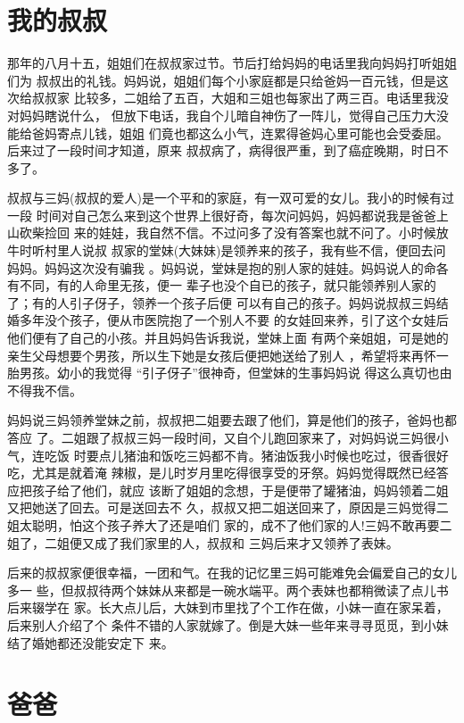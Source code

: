 \documentclass[12pt]{book}
\begin{document}
\section{我的叔叔}
\label{sec-9-24}

那年的八月十五，姐姐们在叔叔家过节。节后打给妈妈的电话里我向妈妈打听姐姐们为
叔叔出的礼钱。妈妈说，姐姐们每个小家庭都是只给爸妈一百元钱，但是这次给叔叔家
比较多，二姐给了五百，大姐和三姐也每家出了两三百。电话里我没对妈妈瞎说什么，
但放下电话，我自个儿暗自神伤了一阵儿，觉得自己压力大没能给爸妈寄点儿钱，姐姐
们竟也都这么小气，连累得爸妈心里可能也会受委屈。后来过了一段时间才知道，原来
叔叔病了，病得很严重，到了癌症晚期，时日不多了。

叔叔与三妈(叔叔的爱人)是一个平和的家庭，有一双可爱的女儿。我小的时候有过一段
时间对自己怎么来到这个世界上很好奇，每次问妈妈，妈妈都说我是爸爸上山砍柴捡回
来的娃娃，我自然不信。不过问多了没有答案也就不问了。小时候放牛时听村里人说叔
叔家的堂妹(大妹妹)是领养来的孩子，我有些不信，便回去问妈妈。妈妈这次没有骗我
。妈妈说，堂妹是抱的别人家的娃娃。妈妈说人的命各有不同，有的人命里无孩，便一
辈子也没个自已的孩子，就只能领养别人家的了；有的人引子伢子，领养一个孩子后便
可以有自己的孩子。妈妈说叔叔三妈结婚多年没个孩子，便从市医院抱了一个别人不要
的女娃回来养，引了这个女娃后他们便有了自己的小孩。并且妈妈告诉我说，堂妹上面
有两个亲姐姐，可是她的亲生父母想要个男孩，所以生下她是女孩后便把她送给了别人
，希望将来再怀一胎男孩。幼小的我觉得 “引子伢子”很神奇，但堂妹的生事妈妈说
得这么真切也由不得我不信。

妈妈说三妈领养堂妹之前，叔叔把二姐要去跟了他们，算是他们的孩子，爸妈也都答应
了。二姐跟了叔叔三妈一段时间，又自个儿跑回家来了，对妈妈说三妈很小气，连吃饭
时要点儿猪油和饭吃三妈都不肯。猪油饭我小时候也吃过，很香很好吃，尤其是就着淹
辣椒，是儿时岁月里吃得很享受的牙祭。妈妈觉得既然已经答应把孩子给了他们，就应
该断了姐姐的念想，于是便带了罐猪油，妈妈领着二姐又把她送了回去。可是送回去不
久，叔叔又把二姐送回来了，原因是三妈觉得二姐太聪明，怕这个孩子养大了还是咱们
家的，成不了他们家的人!三妈不敢再要二姐了，二姐便又成了我们家里的人，叔叔和
三妈后来才又领养了表妹。

后来的叔叔家便很幸福，一团和气。在我的记忆里三妈可能难免会偏爱自己的女儿多一
些，但叔叔待两个妹妹从来都是一碗水端平。两个表妹也都稍微读了点儿书后来辍学在
家。长大点儿后，大妹到市里找了个工作在做，小妹一直在家呆着，后来别人介绍了个
条件不错的人家就嫁了。倒是大妹一些年来寻寻觅觅，到小妹结了婚她都还没能安定下
来。
\section{爸爸}
\label{sec-9-25}
\end{document}
